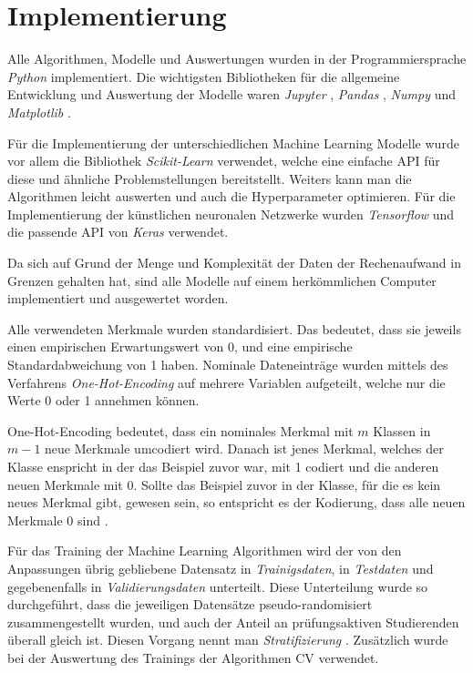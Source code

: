 

\section{Implementierung}
\label{sec:impl}

Alle Algorithmen, Modelle und Auswertungen wurden in der Programmiersprache \textit{Python} \cite{python} implementiert. Die wichtigsten
Bibliotheken f\"ur die allgemeine Entwicklung und Auswertung der Modelle waren
\textit{Jupyter} \cite{jupyter}, \textit{Pandas} \cite{pandas}, \textit{Numpy} \cite{numpy} und \textit{Matplotlib} \cite{plt}.

F\"ur die Implementierung der unterschiedlichen Machine Learning Modelle wurde vor allem die Bibliothek \textit{Scikit-Learn} \cite{sklearn_api} verwendet, welche eine einfache API f\"ur
diese und \"ahnliche Problemstellungen bereitstellt. Weiters kann man die Algorithmen leicht auswerten und auch die Hyperparameter optimieren.
F\"ur die Implementierung der k\"unstlichen neuronalen Netzwerke wurden \textit{Tensorflow} \cite{tensorflow} und die passende API von \textit{Keras} \cite{keras} verwendet.

Da sich auf Grund der Menge und Komplexit\"at der Daten der Rechenaufwand in Grenzen gehalten hat, sind alle Modelle auf einem
herk\"ommlichen Computer implementiert und ausgewertet worden.

Alle verwendeten Merkmale wurden standardisiert. Das bedeutet, dass sie jeweils einen empirischen Erwartungswert
von 0, und eine empirische Standardabweichung von 1 haben. Nominale Dateneintr\"age wurden mittels des Verfahrens \textit{One-Hot-Encoding} auf mehrere Variablen
aufgeteilt, welche nur die Werte 0 oder 1 annehmen k\"onnen.

One-Hot-Encoding bedeutet, dass ein nominales Merkmal mit $m$ Klassen in $m-1$ neue Merkmale umcodiert wird. Danach ist jenes Merkmal, welches
der Klasse enspricht in der das Beispiel zuvor war, mit 1 codiert und die anderen neuen Merkmale mit 0. Sollte das Beispiel zuvor in der Klasse, f\"ur die
es kein neues Merkmal gibt, gewesen sein, so entspricht es der Kodierung, dass alle neuen Merkmale 0 sind \cite[Seite 67]{handson}.

F\"ur das Training der Machine Learning Algorithmen wird der von den Anpassungen \"ubrig gebliebene Datensatz
in \textit{Trainigsdaten}, in \textit{Testdaten} und gegebenenfalls in \textit{Validierungsdaten} unterteilt.
Diese Unterteilung wurde so durchgef\"uhrt, dass die jeweiligen Datens\"atze pseudo-randomisiert zusammengestellt wurden,
und auch der Anteil an pr\"ufungsaktiven Studierenden \"uberall gleich ist. Diesen Vorgang nennt man \textit{Stratifizierung} \cite[Seite 53]{handson}. Zus\"atzlich wurde bei der Auswertung des Trainings der
Algorithmen \gls{CV} verwendet.

